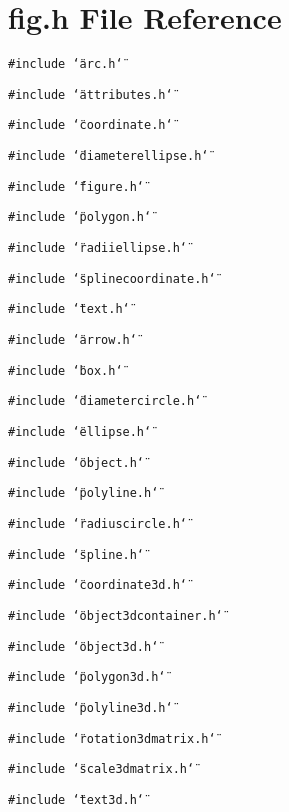 \section{fig.h File Reference}
\label{fig_8h}
{\tt \#include \char`\"{}arc.h\char`\"{}}\par
{\tt \#include \char`\"{}attributes.h\char`\"{}}\par
{\tt \#include \char`\"{}coordinate.h\char`\"{}}\par
{\tt \#include \char`\"{}diameterellipse.h\char`\"{}}\par
{\tt \#include \char`\"{}figure.h\char`\"{}}\par
{\tt \#include \char`\"{}polygon.h\char`\"{}}\par
{\tt \#include \char`\"{}radiiellipse.h\char`\"{}}\par
{\tt \#include \char`\"{}splinecoordinate.h\char`\"{}}\par
{\tt \#include \char`\"{}text.h\char`\"{}}\par
{\tt \#include \char`\"{}arrow.h\char`\"{}}\par
{\tt \#include \char`\"{}box.h\char`\"{}}\par
{\tt \#include \char`\"{}diametercircle.h\char`\"{}}\par
{\tt \#include \char`\"{}ellipse.h\char`\"{}}\par
{\tt \#include \char`\"{}object.h\char`\"{}}\par
{\tt \#include \char`\"{}polyline.h\char`\"{}}\par
{\tt \#include \char`\"{}radiuscircle.h\char`\"{}}\par
{\tt \#include \char`\"{}spline.h\char`\"{}}\par
{\tt \#include \char`\"{}coordinate3d.h\char`\"{}}\par
{\tt \#include \char`\"{}object3dcontainer.h\char`\"{}}\par
{\tt \#include \char`\"{}object3d.h\char`\"{}}\par
{\tt \#include \char`\"{}polygon3d.h\char`\"{}}\par
{\tt \#include \char`\"{}polyline3d.h\char`\"{}}\par
{\tt \#include \char`\"{}rotation3dmatrix.h\char`\"{}}\par
{\tt \#include \char`\"{}scale3dmatrix.h\char`\"{}}\par
{\tt \#include \char`\"{}text3d.h\char`\"{}}\par

